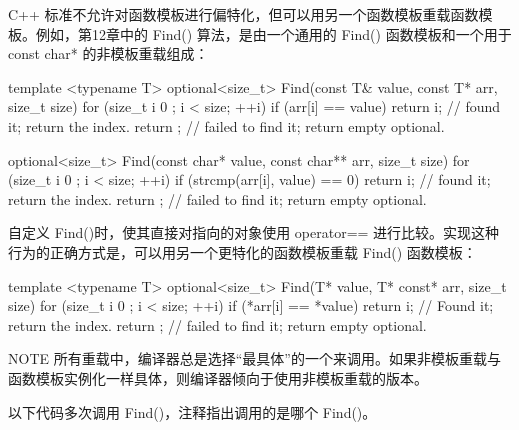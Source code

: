 C++ 标准不允许对函数模板进行偏特化，但可以用另一个函数模板重载函数模板。例如，第12章中的 Find() 算法，是由一个通用的 Find() 函数模板和一个用于 const char* 的非模板重载组成：

\begin{cpp}
template <typename T>
optional<size_t> Find(const T& value, const T* arr, size_t size)
{
    for (size_t i { 0 }; i < size; ++i) {
        if (arr[i] == value) {
            return i; // found it; return the index.
        }
    }
    return {}; // failed to find it; return empty optional.
}

optional<size_t> Find(const char* value, const char** arr, size_t size)
{
    for (size_t i { 0 }; i < size; ++i) {
        if (strcmp(arr[i], value) == 0) {
            return i; // found it; return the index.
        }
    }
    return {}; // failed to find it; return empty optional.
}
\end{cpp}

自定义 Find()时，使其直接对指向的对象使用 operator== 进行比较。实现这种行为的正确方式是，可以用另一个更特化的函数模板重载 Find() 函数模板：

\begin{cpp}
template <typename T>
optional<size_t> Find(T* value, T* const* arr, size_t size)
{
    for (size_t i { 0 }; i < size; ++i) {
        if (*arr[i] == *value) {
            return i; // Found it; return the index.
        }
    }
    return {}; // failed to find it; return empty optional.
}
\end{cpp}

\begin{myNotic}{NOTE}
所有重载中，编译器总是选择“最具体”的一个来调用。如果非模板重载与函数模板实例化一样具体，则编译器倾向于使用非模板重载的版本。
\end{myNotic}

以下代码多次调用 Find()，注释指出调用的是哪个 Find()。

